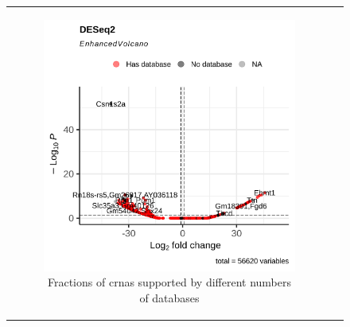 \begin{figure}[H] \begin{tabular}{cc}
        \begin{subfigure}{0.5\textwidth} \centering

            \includegraphics[width=\linewidth]{chapters/4_results_and_discussion/figures/dea/deseq2/tamoxifen/volcano.png}
            \caption{Fractions of \glspl{crna} supported by
                different numbers of databases}
            \label{fig:tamoxifen_volcano_deseq2}
        \end{subfigure}
        \begin{subfigure}{0.5\textwidth}
            \centering


\end{subfigure}
\end{tabular}
\end{figure}
